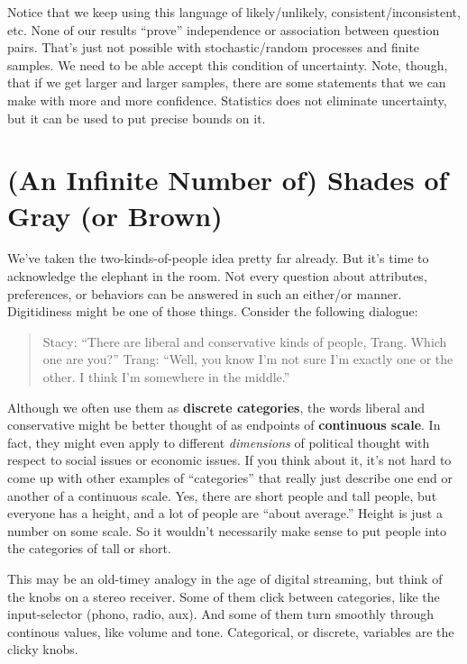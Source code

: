 \documentclass[
  openany]{book}
\begin{document}
Notice that we keep using this language of likely/unlikely, consistent/inconsistent, etc. None of our results ``prove'' independence or association between question pairs. That's just not possible with stochastic/random processes and finite samples. We need to be able accept this condition of uncertainty. Note, though, that if we get larger and larger samples, there are some statements that we can make with more and more confidence. Statistics does not eliminate uncertainty, but it can be used to put precise bounds on it.

\hypertarget{shades}{%
\chapter{(An Infinite Number of) Shades of Gray (or Brown)}\label{shades}}

We've taken the two-kinds-of-people idea pretty far already. But it's time to acknowledge the elephant in the room. Not every question about attributes, preferences, or behaviors can be answered in such an either/or manner. Digitidiness might be one of those things. Consider the following dialogue:

\begin{quote}
Stacy: ``There are liberal and conservative kinds of people, Trang. Which one are you?''
Trang: ``Well, you know I'm not sure I'm exactly one or the other. I think I'm somewhere in the middle.''
\end{quote}

Although we often use them as \textbf{discrete categories}, the words liberal and conservative might be better thought of as endpoints of \textbf{continuous scale}. In fact, they might even apply to different \emph{dimensions} of political thought with respect to social issues or economic issues. If you think about it, it's not hard to come up with other examples of ``categories'' that really just describe one end or another of a continuous scale. Yes, there are short people and tall people, but everyone has a height, and a lot of people are ``about average.'' Height is just a number on some scale. So it wouldn't necessarily make sense to put people into the categories of tall or short.

This may be an old-timey analogy in the age of digital streaming, but think of the knobs on a stereo receiver. Some of them click between categories, like the input-selector (phono, radio, aux). And some of them turn smoothly through continous values, like volume and tone. Categorical, or discrete, variables are the clicky knobs.
\end{document}

